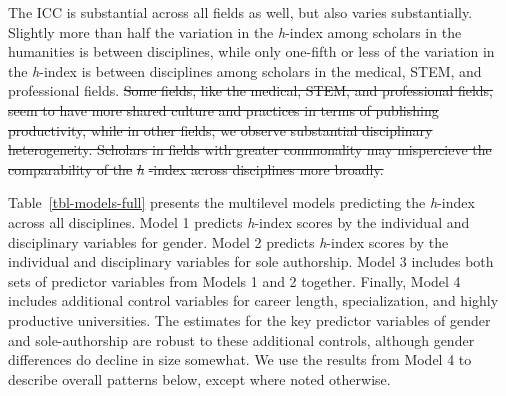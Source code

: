 \documentclass[
  10pt,
  letterpaper,
]{article}
\providecommand{\DIFdeltex}[1]{{\protect\color{red}\sout{#1}}}                      %
\providecommand{\DIFdelbegin}{} %
\providecommand{\DIFdelend}{} %
\providecommand{\DIFdel}[1]{\texorpdfstring{\DIFdeltex{#1}}{}} %
\newcommand{\DIFscaledelfig}{0.5}
\newlength{\DIFdelgraphicswidth} %
\newlength{\DIFdelgraphicsheight} %
\newcommand{\DIFdelincludegraphics}[2][]{%
\sbox{\DIFdelgraphicsbox}{\DIFOincludegraphics[#1]{#2}}%
\settoboxwidth{\DIFdelgraphicswidth}{\DIFdelgraphicsbox} %
\settoboxtotalheight{\DIFdelgraphicsheight}{\DIFdelgraphicsbox} %
\scalebox{\DIFscaledelfig}{%
\parbox[b]{\DIFdelgraphicswidth}{\usebox{\DIFdelgraphicsbox}\\[-\baselineskip] \rule{\DIFdelgraphicswidth}{0em}}\llap{\resizebox{\DIFdelgraphicswidth}{\DIFdelgraphicsheight}{%
\setlength{\unitlength}{\DIFdelgraphicswidth}%
\begin{picture}(1,1)%
\thicklines\linethickness{2pt} %
{\color[rgb]{1,0,0}\put(0,0){\framebox(1,1){}}}%
{\color[rgb]{1,0,0}\put(0,0){\line( 1,1){1}}}%
{\color[rgb]{1,0,0}\put(0,1){\line(1,-1){1}}}%
\end{picture}%
}\hspace*{3pt}}} %
} %
\DeclareRobustCommand{\DIFdelbegin}{\DIFOdelbegin \let\includegraphics\DIFdelincludegraphics} %
\DeclareRobustCommand{\DIFdelend}{\DIFOaddend \let\includegraphics\DIFOincludegraphics} %
\begin{document}
The ICC is substantial across all fields as well, but also varies
substantially. Slightly more than half the variation in the
\emph{h}-index among scholars in the humanities is between disciplines,
while only one-fifth or less of the variation in the \emph{h}-index is
between disciplines among scholars in the medical, STEM, and
professional fields.
\DIFdelbegin \DIFdel{Some fields, like the medical, STEM, and
professional fields, seem to have more shared culture and practices in
terms of publishing productivity, while in other fields, we observe
substantial disciplinary heterogeneity. Scholars in fields with greater
commonality may mispercieve the comparability of the }\emph{\DIFdel{h}}%
\DIFdel{-index
across disciplines more broadly.
}\DIFdelend 

Table~\ref{tbl-models-full} presents the multilevel models predicting
the \emph{h}-index across all disciplines. Model 1 predicts
\emph{h}-index scores by the individual and disciplinary variables for
gender. Model 2 predicts \emph{h}-index scores by the individual and
disciplinary variables for sole authorship. Model 3 includes both sets
of predictor variables from Models 1 and 2 together. Finally, Model 4
includes additional control variables for career length, specialization,
and highly productive universities. The estimates for the key predictor
variables of gender and sole-authorship are robust to these additional
controls, although gender differences do decline in size somewhat. We
use the results from Model 4 to describe overall patterns below, except
where noted otherwise.
\end{document}
